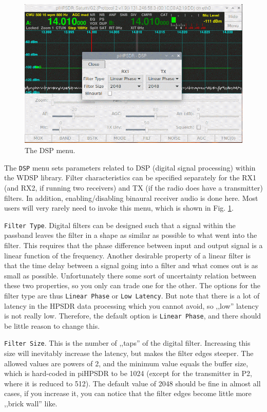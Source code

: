 \documentclass[12pt]{book}
\def\rett#1{\texttt{\color{red}#1}}
\def\bltt#1{\texttt{\color{blue}#1}}
\begin{document}
\begin{figure}[ht]
\center
\includegraphics[width=12cm]{DSPMenu.png}
\caption{The DSP menu.}
\label{fig:DSPMenu}
\end{figure}

The \bltt{DSP} menu sets parameters related to DSP (digital signal processing)
within the WDSP library.
Filter characteristics can be specified separately for the RX1 (and RX2, if
running two receivers) and TX (if the radio does have a transmitter)
filters. In addition, enabling/disabling binaural receiver audio
is done here.  Most users will
very rarely need to invoke this menu, which is shown
in Fig. \ref{fig:DSPMenu}.

\rett{Filter Type}. Digital filters can be designed such that a signal within the
passband leaves the filter in a shape as similar as possible
to what went into the filter. This requires that the phase
difference between input and output signal is a linear
function of the frequency. Another desirable property
of a linear filter is that the time delay between a signal
going into a filter and what comes out is as small as
possible. Unfortunately there some sort of uncertainty
relation between these two properties, so you only can
trade one for the other. The options for the filter type
are thus \rett{Linear Phase} or \rett{Low Latency}.
But note that there is a lot of latency in the HPSDR data
processing which you cannot avoid, so ,,low'' latency
is not really low. Therefore, the default option
is \rett{Linear Phase}, and there should be little reason
to change this.

\rett{Filter Size}. This is the number of ,,taps'' of the digital
filter. Increasing this size will inevitably increase the latency,
but makes the filter edges steeper. The allowed values are
powers of 2, and the minimum value equals the buffer size, which
is hard-coded in piHPSDR to be 1024 (except for the transmitter in P2,
where it is reduced to 512). The default value of 2048 should be
fine in almost all cases, if you increase it, you can notice that
the filter edges become little more ,,brick wall'' like.
\end{document}
